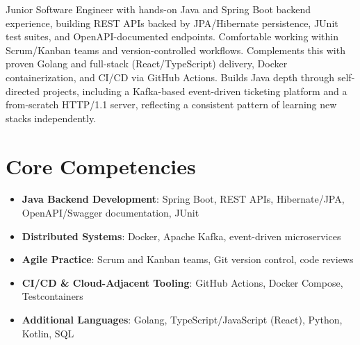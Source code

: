 \documentclass[11pt,a4paper,sans]{moderncv}
\begin{document}
\makecvtitle


\vspace{6pt}
\small{Junior Software Engineer with hands-on Java and Spring Boot backend experience, building REST APIs backed by JPA/Hibernate persistence, JUnit test suites, and OpenAPI-documented endpoints. Comfortable working within Scrum/Kanban teams and version-controlled workflows. Complements this with proven Golang and full-stack (React/TypeScript) delivery, Docker containerization, and CI/CD via GitHub Actions. Builds Java depth through self-directed projects, including a Kafka-based event-driven ticketing platform and a from-scratch HTTP/1.1 server, reflecting a consistent pattern of learning new stacks independently.}


\section{Core Competencies}
\vspace{1pt}
\begin{itemize}

\item \textbf{Java Backend Development}: Spring Boot, REST APIs, Hibernate/JPA, OpenAPI/Swagger documentation, JUnit

\item \textbf{Distributed Systems}: Docker, Apache Kafka, event-driven microservices

\item \textbf{Agile Practice}: Scrum and Kanban teams, Git version control, code reviews

\item \textbf{CI/CD \& Cloud-Adjacent Tooling}: GitHub Actions, Docker Compose, Testcontainers

\item \textbf{Additional Languages}: Golang, TypeScript/JavaScript (React), Python, Kotlin, SQL

\end{itemize}

\end{document}
